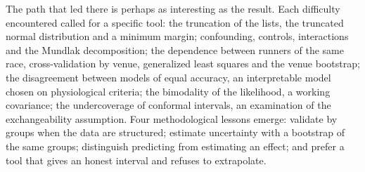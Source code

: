 \documentclass[11pt,a4paper]{article}
\begin{document}
The path that led there is perhaps as interesting as the result. Each difficulty encountered called for a specific
tool: the truncation of the lists, the truncated normal distribution and a minimum margin; confounding, controls,
interactions and the Mundlak decomposition; the dependence between runners of the same race, cross-validation by
venue, generalized least squares and the venue bootstrap; the disagreement between models of equal accuracy, an
interpretable model chosen on physiological criteria; the bimodality of the likelihood, a working covariance; the
undercoverage of conformal intervals, an examination of the exchangeability assumption. Four methodological lessons
emerge: validate by groups when the data are structured; estimate uncertainty with a bootstrap of the same groups;
distinguish predicting from estimating an effect; and prefer a tool that gives an honest interval and refuses to
extrapolate.
\end{document}
